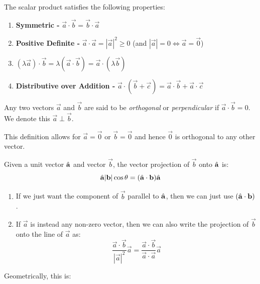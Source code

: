 \documentclass[../main.tex]{subfiles}
\begin{document}
The scalar product satisfies the following properties:
\begin{enumerate}
  \item \textbf{Symmetric -} $\vec{a} \cdot \vec{b} = \vec{b} \cdot \vec{a}$
  \item \textbf{Positive Definite -} $\vec{a} \cdot \vec{a} = |\vec{a}|^2 \geq 0$ (and $|\vec{a}| = 0 \iff \vec{a} = \vec{0}$)
  \item $(\lambda \vec{a}) \cdot \vec{b} = \lambda (\vec{a} \cdot \vec{b}) = \vec{a} \cdot (\lambda \vec{b})$
  \item \textbf{Distributive over Addition -} $\vec{a} \cdot (\vec{b} + \vec{c}) = \vec{a} \cdot \vec{b} + \vec{a} \cdot \vec{c}$
\end{enumerate}
\begin{definition}[Orthogonal]
  Any two vectors $\vec{a}$ and $\vec{b}$ are said to be \textit{orthogonal} or \textit{perpendicular} if $\vec{a} \cdot \vec{b} = 0$.
  We denote this $\vec{a} \perp \vec{b}$.
\end{definition}
\begin{remark}[Note]
  This definition allows for $\vec{a} = \vec{0}$ or $\vec{b} = \vec{0}$ and hence $\vec{0}$ is orthogonal to any other vector.
\end{remark}
\begin{definition}[Projection]
  Given a unit vector $\hat{\mathbf{\bm{a}}}$ and vector $\vec{b}$, the vector projection of $\vec{b}$ onto $\hat{\mathbf{\bm{a}}}$ is:
  \[
    \hat{\mathbf{\bm{a}}}|\mathbf{\bm{b}}|\cos \theta = (\hat{\mathbf{\bm{a}}} \cdot \mathbf{\bm{b}}) \hat{\mathbf{\bm{a}}}
  \]
\end{definition}
\begin{remark}
  \begin{enumerate}
    \item If we just want the component of $\vec{b}$ parallel to $\hat{\mathbf{\bm{a}}}$, then we can just use $(\hat{\mathbf{\bm{a}}} \cdot \mathbf{\bm{b}})$.
    \item If $\vec{a}$ is instead any non-zero vector, then we can also write the projection of $\vec{b}$ onto the line of $\vec{a}$ as:
      \[
        \frac{\vec{a} \cdot \vec{b}}{|\vec{a}|^2} \vec{a} = \frac{\vec{a} \cdot \vec{b}}{\vec{a} \cdot \vec{a}} \vec{a}
      \]
  \end{enumerate}
\end{remark}
Geometrically, this is:
\end{document}
